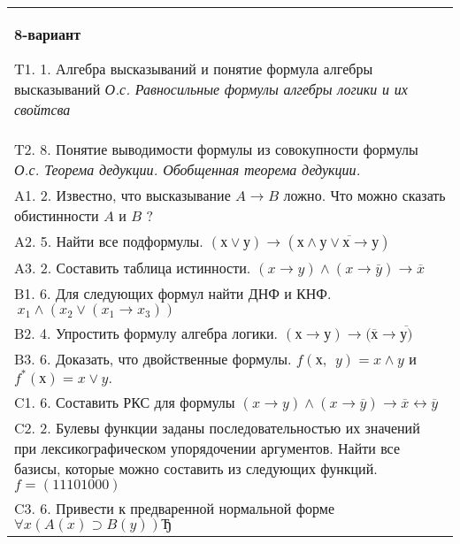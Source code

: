 \documentclass{article}
\begin{document}
\begin{tabular}{m{17cm}}
\textbf{8-вариант}
\newline

T1. 1. Алгебра высказываний и понятие формула алгебры высказываний \emph{О.с. Равносильные формулы алгебры логики и их свойтсва} \\
T2. 8. Понятие выводимости формулы из совокупности формулы \emph{О.с. Теорема дедукции. Обобщенная теорема дедукции.} \\
A1. 2. Известно, что высказывание \(A \rightarrow B\) ложно. Что можно сказать обистинности \(A\) и \(B\) ? \\
A2. 5. Найти все подформулы. \((х \vee у) \rightarrow \left( х \land \overline{у \vee х \rightarrow у} \right)\) \\
A3. 2. Составить таблица истинности. \((x \rightarrow y) \land (x \rightarrow \overline{y}) \rightarrow \overline{x}\) \\
B1. 6. Для следующих формул найти ДНФ и КНФ. \(\ x_{1} \land (x_{2} \vee (x_{1} \rightarrow x_{3}))\) \\
B2. 4. Упростить формулу алгебра логики. \((х \rightarrow у) \rightarrow (\overline{х} \rightarrow \overline{у)}\) \\
B3. 6. Доказать, что двойственные формулы. \(f(х,\ \ y) = x \land y\) и \(f^{*}(х) = x \vee y.\) \\
C1. 6. Составить РКС для формулы \((x \rightarrow y) \land (x \rightarrow \overline{y}) \rightarrow \overline{x} \leftrightarrow \overline{y}\) \\
C2. 2. Булевы функции заданы последовательностью их значений при лексикографическом упорядочении аргументов. Найти все базисы, которые можно составить из следующих функций. \(f = (11101000)\) \\
C3. 6. Привести к предваренной нормальной форме \(\forall x(A(x) \supset B(y))Ђ\) \\

\end{tabular}
\vspace{1cm}
\end{document}
